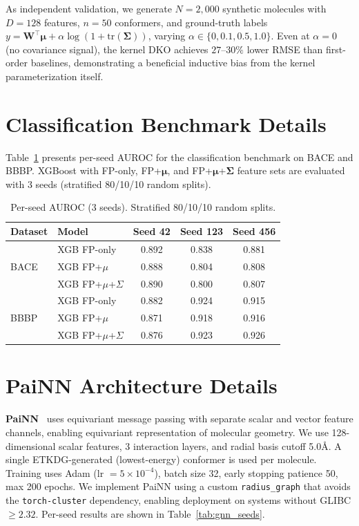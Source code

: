 \documentclass[sigconf]{acmart}
\newcommand{\rev}[1]{#1}
\begin{document}
As independent validation, we generate $N{=}2{,}000$ synthetic molecules with $D{=}128$ features, $n{=}50$ conformers, and ground-truth labels $y = \mathbf{W}^\top\boldsymbol{\mu} + \alpha\log(1 + \mathrm{tr}(\boldsymbol{\Sigma}))$, varying $\alpha \in \{0, 0.1, 0.5, 1.0\}$. Even at $\alpha{=}0$ (no covariance signal), the kernel DKO achieves $27$--$30\%$ lower RMSE than first-order baselines, demonstrating a beneficial inductive bias from the kernel parameterization itself.

\section{\rev{Classification Benchmark Details}}
\label{app:classification}

\rev{Table~\ref{tab:class_full} presents per-seed AUROC for the classification benchmark on BACE and BBBP. XGBoost with FP-only, FP+$\boldsymbol{\mu}$, and FP+$\boldsymbol{\mu}$+$\boldsymbol{\Sigma}$ feature sets are evaluated with 3 seeds (stratified 80/10/10 random splits).}

\begin{table}[ht]
\caption{\rev{Per-seed AUROC (3 seeds). Stratified 80/10/10 random splits.}}
\label{tab:class_full}
\centering
\small
\begin{tabular}{@{}llccc@{}}
\toprule
Dataset & Model & Seed 42 & Seed 123 & Seed 456 \\
\midrule
\multirow{3}{*}{BACE} & XGB FP-only & 0.892 & 0.838 & 0.881 \\
                       & XGB FP+$\mu$ & 0.888 & 0.804 & 0.808 \\
                       & XGB FP+$\mu$+$\Sigma$ & 0.890 & 0.800 & 0.807 \\
\midrule
\multirow{3}{*}{BBBP} & XGB FP-only & 0.882 & 0.924 & 0.915 \\
                       & XGB FP+$\mu$ & 0.871 & 0.918 & 0.916 \\
                       & XGB FP+$\mu$+$\Sigma$ & 0.876 & 0.923 & 0.926 \\
\bottomrule
\end{tabular}
\end{table}

\section{\rev{PaiNN Architecture Details}}
\label{app:dimenet_painn}

\rev{\textbf{PaiNN}~\cite{schutt2021painn} uses equivariant message passing with separate scalar and vector feature channels, enabling equivariant representation of molecular geometry. We use 128-dimensional scalar features, 3 interaction layers, and radial basis cutoff 5.0\AA. A single ETKDG-generated (lowest-energy) conformer is used per molecule. Training uses Adam (lr $= 5 \times 10^{-4}$), batch size 32, early stopping patience 50, max 200 epochs. We implement PaiNN using a custom \texttt{radius\_graph} that avoids the \texttt{torch-cluster} dependency, enabling deployment on systems without GLIBC $\geq 2.32$. Per-seed results are shown in Table~\ref{tab:gnn_seeds}.}
\end{document}
